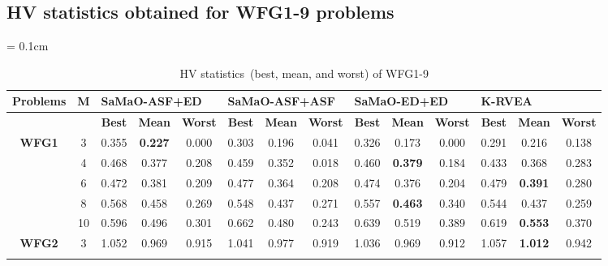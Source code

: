 \documentclass[onecolumn,10pt]{asme2ej}
\begin{document}
\clearpage

\subsection{HV statistics obtained for WFG1-9 problems}
\begin{table}[!htb]\scriptsize
	\centering
	\caption{HV statistics~(best, mean, and worst) of WFG1-9}
	\label{tab:KHTTab:2}
	\tabcolsep = 0.1cm
	\begin{tabular}{|c|c|c|c|c|c|c|c|c|c|c|c|c|c|}
	\hline
	\textbf{Problems}              & \textbf{M} & \multicolumn{3}{l|}{\textbf{SaMaO-ASF+ED}}      & \multicolumn{3}{l|}{\textbf{SaMaO-ASF+ASF}}     & \multicolumn{3}{l|}{\textbf{SaMaO-ED+ED}}       & \multicolumn{3}{l|}{\textbf{K-RVEA}}            \\ \hline
	\textbf{}                      & \textbf{}  & \textbf{Best} & \textbf{Mean}  & \textbf{Worst} & \textbf{Best} & \textbf{Mean}  & \textbf{Worst} & \textbf{Best} & \textbf{Mean}  & \textbf{Worst} & \textbf{Best} & \textbf{Mean}  & \textbf{Worst} \\ \hline
	\multirow{5}{*}{\textbf{WFG1}} & 3          & 0.355         & \textbf{0.227} & 0.000          & 0.303         & 0.196          & 0.041          & 0.326         & 0.173          & 0.000          & 0.291         & 0.216          & 0.138          \\ \cline{2-14} 
	& 4          & 0.468         & 0.377          & 0.208          & 0.459         & 0.352          & 0.018          & 0.460         & \textbf{0.379} & 0.184          & 0.433         & 0.368          & 0.283          \\ \cline{2-14} 
	& 6          & 0.472         & 0.381          & 0.209          & 0.477         & 0.364          & 0.208          & 0.474         & 0.376          & 0.204          & 0.479         & \textbf{0.391} & 0.280          \\ \cline{2-14} 
	& 8          & 0.568         & 0.458          & 0.269          & 0.548         & 0.437          & 0.271          & 0.557         & \textbf{0.463} & 0.340          & 0.544         & 0.437          & 0.259          \\ \cline{2-14} 
	& 10         & 0.596         & 0.496          & 0.301          & 0.662         & 0.480          & 0.243          & 0.639         & 0.519          & 0.389          & 0.619         & \textbf{0.553} & 0.370          \\ \hline
	\multirow{5}{*}{\textbf{WFG2}} & 3          & 1.052         & 0.969          & 0.915          & 1.041         & 0.977          & 0.919          & 1.036         & 0.969          & 0.912          & 1.057         & \textbf{1.012} & 0.942          \\ \cline{2-14} 

\end{tabular}
\end{table}
\end{document}
